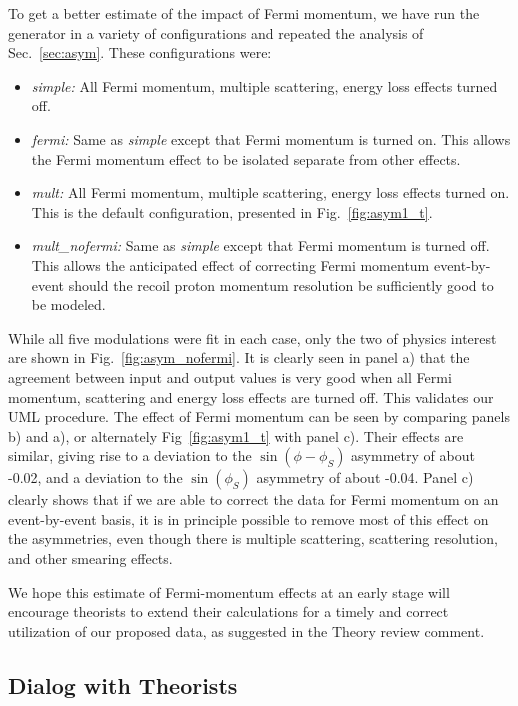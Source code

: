 To get a better estimate of the impact of Fermi momentum, we have run the
generator in a variety of configurations and repeated the analysis of
Sec.~\ref{sec:asym}.  These configurations were:
\begin{itemize}
\item{{\it simple:} All Fermi momentum, multiple scattering, energy loss effects
  turned off.}
\item{{\it fermi:} Same as {\it simple} except that Fermi momentum is turned
  on.  This allows the Fermi momentum effect to be isolated separate from other
  effects.}
\item{{\it mult:} All Fermi momentum, multiple scattering, energy loss effects
  turned on.  This is the default configuration, presented in
  Fig.~\ref{fig:asym1_t}.}
\item{{\it mult\_nofermi:} Same as {\it simple} except that Fermi momentum is
  turned off.  This allows the anticipated effect of correcting Fermi momentum
  event-by-event should the recoil proton momentum resolution be sufficiently
  good to be modeled.}
\end{itemize}

While all five modulations were fit in each case, only the two of physics
interest are shown in Fig.~\ref{fig:asym_nofermi}.  It is clearly seen in panel
a) that the agreement between input and output values is very good when all
Fermi momentum, scattering and energy loss effects are turned off.  This
validates our UML procedure.  The effect of Fermi momentum can be seen by
comparing panels b) and a), or alternately Fig~\ref{fig:asym1_t} with panel c).
Their effects are similar, giving rise to a deviation to the
$\sin(\phi-\phi_S)$ asymmetry of about -0.02, and a deviation to the
$\sin(\phi_S)$ asymmetry of about -0.04.  Panel c) clearly shows that if we are
able to correct the data for Fermi momentum on an event-by-event basis, it is
in principle possible to remove most of this effect on the asymmetries, even
though there is multiple scattering, scattering resolution, and other smearing
effects.

We hope this estimate of Fermi-momentum effects at an early stage will
encourage theorists to extend their calculations for a timely and correct
utilization of our proposed data, as suggested in the Theory review comment.

\subsection{Dialog with Theorists}

